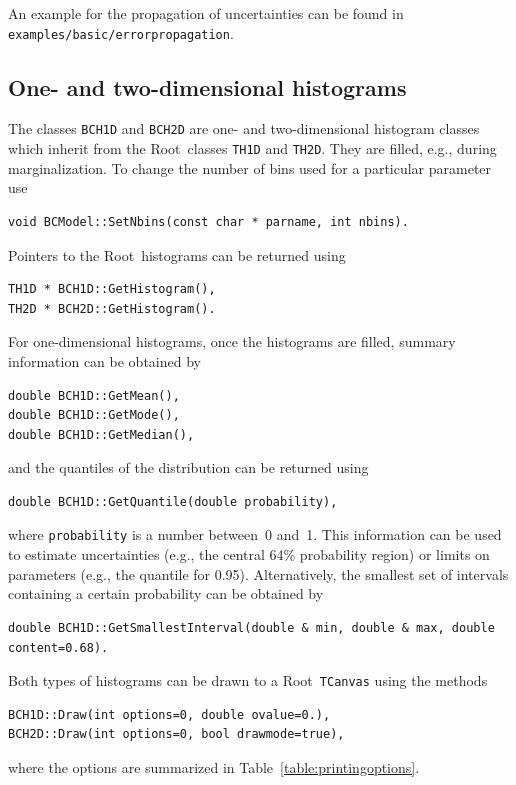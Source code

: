 \documentclass[11pt, a4paper]{article}
\newcommand{\Root}{{\sc Root}}
\begin{document}
An example for the propagation of uncertainties can be found in
\linebreak \verb|examples/basic/errorpropagation|.


\subsection{One- and two-dimensional histograms}

The classes \verb|BCH1D| and \verb|BCH2D| are one- and two-dimensional
histogram classes which inherit from the \Root\ classes \verb|TH1D|
and \verb|TH2D|. They are filled, e.g., during marginalization. To
change the number of bins used for a particular parameter use
%
\begin{verbatim}
void BCModel::SetNbins(const char * parname, int nbins).
\end{verbatim}
%
Pointers to the \Root\ histograms can be returned
using
%
\begin{verbatim}
TH1D * BCH1D::GetHistogram(),
TH2D * BCH2D::GetHistogram().
\end{verbatim}
%
For one-dimensional histograms, once the histograms are filled,
summary information can be obtained by
%
\begin{verbatim}
double BCH1D::GetMean(),
double BCH1D::GetMode(),
double BCH1D::GetMedian(),
\end{verbatim}
%
and the quantiles of the distribution can be returned using
%
\begin{verbatim}
double BCH1D::GetQuantile(double probability),
\end{verbatim}
%
where \verb|probability| is a number between~0 and~1. This information
can be used to estimate uncertainties (e.g., the central 64\%
probability region) or limits on parameters (e.g., the quantile for
0.95). Alternatively, the smallest set of intervals containing a
certain probability can be obtained by
%
\begin{verbatim}
double BCH1D::GetSmallestInterval(double & min, double & max, double content=0.68).
\end{verbatim}

Both types of histograms can be drawn to a \Root\ \verb|TCanvas| using
the methods
%
\begin{verbatim}
BCH1D::Draw(int options=0, double ovalue=0.),
BCH2D::Draw(int options=0, bool drawmode=true),
\end{verbatim}
%
where the options are summarized in Table~\ref{table:printingoptions}.
\end{document}
